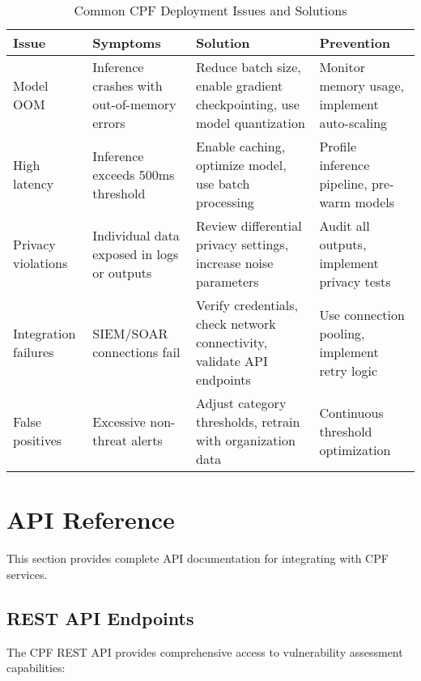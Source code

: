 \documentclass[11pt,a4paper]{article}
\begin{document}
\begin{table}[H]
\centering
\caption{Common CPF Deployment Issues and Solutions}
\label{tab:troubleshooting}
\begin{tabular}{p{3cm}p{4cm}p{5cm}p{3cm}}
\toprule
\textbf{Issue} & \textbf{Symptoms} & \textbf{Solution} & \textbf{Prevention} \\
\midrule
Model OOM & Inference crashes with out-of-memory errors & Reduce batch size, enable gradient checkpointing, use model quantization & Monitor memory usage, implement auto-scaling \\
\midrule
High latency & Inference exceeds 500ms threshold & Enable caching, optimize model, use batch processing & Profile inference pipeline, pre-warm models \\
\midrule
Privacy violations & Individual data exposed in logs or outputs & Review differential privacy settings, increase noise parameters & Audit all outputs, implement privacy tests \\
\midrule
Integration failures & SIEM/SOAR connections fail & Verify credentials, check network connectivity, validate API endpoints & Use connection pooling, implement retry logic \\
\midrule
False positives & Excessive non-threat alerts & Adjust category thresholds, retrain with organization data & Continuous threshold optimization \\
\bottomrule
\end{tabular}
\end{table}

\section{API Reference}
\label{app:api}

This section provides complete API documentation for integrating with CPF services.

\subsection{REST API Endpoints}

The CPF REST API provides comprehensive access to vulnerability assessment capabilities:
\end{document}
